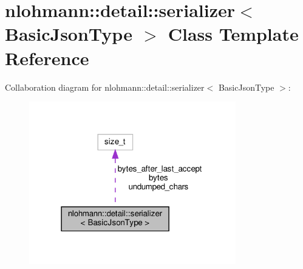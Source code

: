 \hypertarget{classnlohmann_1_1detail_1_1serializer}{}\section{nlohmann\+:\+:detail\+:\+:serializer$<$ Basic\+Json\+Type $>$ Class Template Reference}
\label{classnlohmann_1_1detail_1_1serializer}


Collaboration diagram for nlohmann\+:\+:detail\+:\+:serializer$<$ Basic\+Json\+Type $>$\+:
\nopagebreak
\begin{figure}[H]
\begin{center}
\leavevmode
\includegraphics[width=255pt]{classnlohmann_1_1detail_1_1serializer__coll__graph}
\end{center}
\end{figure}

